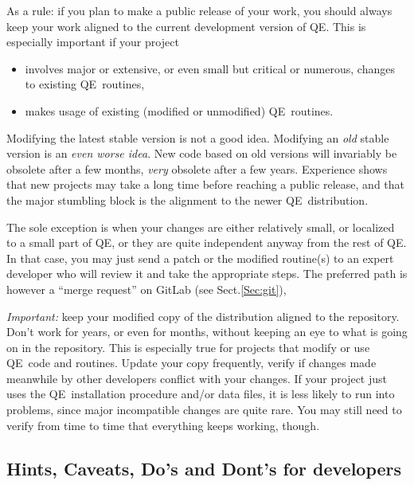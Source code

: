 \documentclass[12pt,a4paper]{article}
\def\qe{QE}
\begin{document}
As a rule: if you plan to make a public release of your work, you
should always keep your work aligned to the current development version
of \qe. This is especially important if your project
\begin{itemize}
\item involves major or extensive, or even small but critical or numerous,
  changes to existing \qe\ routines,
\item makes usage of existing (modified or unmodified) \qe\ routines.
\end{itemize}
Modifying the latest stable version is not a good idea. Modifying
an {\em old} stable version is an {\em even worse idea}. New code
based on old versions will invariably be obsolete after a few months,
{\em very} obsolete after a few years. Experience shows that new projects
may take a long time before reaching a public release, and that the
major stumbling block is the alignment to the newer \qe\ distribution.

The sole exception is when your changes are either relatively small, or
localized to a small part of \qe, or they are quite independent anyway
from the rest of \qe. In that case, you may just send a patch or the
modified routine(s) to an expert developer who will review it and
take the appropriate steps. The preferred path is however a ``merge request''
on GitLab (see Sect.\ref{Sec:git}),

{\em Important:} keep your modified copy of the distribution aligned to the
repository. Don't work for years, or even for months, without keeping an eye
to what is going on in the repository. This is especially true for projects
that modify or use \qe\ code and routines. Update your copy frequently,
verify if changes made meanwhile by other developers conflict with your
changes. 
If your project just uses the \qe\ installation procedure and/or data files,
it is less likely to run into problems, since major incompatible changes are
quite rare. You may still need to verify from time to time that everything keeps
working, though.

\subsection{Hints, Caveats, Do's and Dont's for developers}
\end{document}
